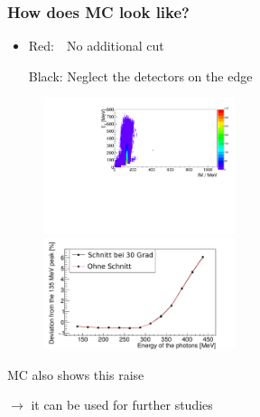 \documentclass[slidestop,compress,mathserif]{beamer}
\begin{document}
\begin{frame}
	\frametitle{How does MC look like?}
	\begin{itemize}
	
	
	\item Red:\, \, No additional cut
	
	Black: Neglect the detectors on the edge
		
	\end{itemize}

\begin{figure}
	
	\includegraphics[width=0.50\textwidth]{Pictures/20171904SimNoCut2DHist}
	\hfill
	\includegraphics[width=0.50\textwidth]{Pictures/20172804MCBothDeviation}

\end{figure}	
	MC also shows this raise
	
	$\rightarrow$ it can be used for further studies
\end{frame}
\end{document}
